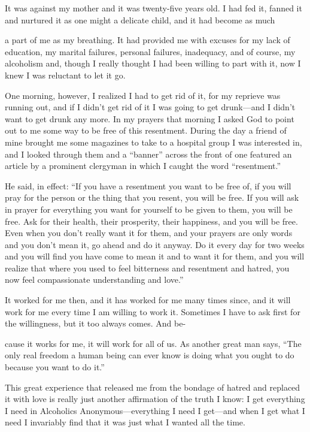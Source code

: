 It was against my mother and it was twenty-five years old. I had fed it, fanned it and nurtured it as one might a delicate child, and it had become as much

a part of me as my breathing. It had provided me with excuses for my lack of education, my marital failures, personal failures, inadequacy, and of course, my alcoholism and, though I really thought I had been willing to part with it, now I knew I was reluctant to let it go.

One morning, however, I realized I had to get rid of it, for my reprieve was running out, and if I didn’t get rid of it I was going to get drunk—and I didn’t want to get drunk any more. In my prayers that morning I asked God to point out to me some way to be free of this resentment. During the day a friend of mine brought me some magazines to take to a hospital group I was interested in, and I looked through them and a “banner” across the front of one featured an article by a prominent clergyman in which I caught the word “resentment.”

He said, in effect: “If you have a resentment you want to be free of, if you will pray for the person or the thing that you resent, you will be free. If you will ask in prayer for everything you want for yourself to be given to them, you will be free. Ask for their health, their prosperity, their happiness, and you will be free. Even when you don’t really want it for them, and your prayers are only words and you don’t mean it, go ahead and do it anyway. Do it every day for two weeks and you will find you have come to mean it and to want it for them, and you will realize that where you used to feel bitterness and resentment and hatred, you now feel compassionate understanding and love.”

It worked for me then, and it has worked for me many times since, and it will work for me every time I am willing to work it. Sometimes I have to ask first for the willingness, but it too always comes. And be-

cause it works for me, it will work for all of us. As another great man says, “The only real freedom a human being can ever know is doing what you ought to do because you want to do it.”

This great experience that released me from the bondage of hatred and replaced it with love is really just another affirmation of the truth I know: I get everything I need in Alcoholics Anonymous—everything I need I get—and when I get what I need I invariably find that it was just what I wanted all the time.
